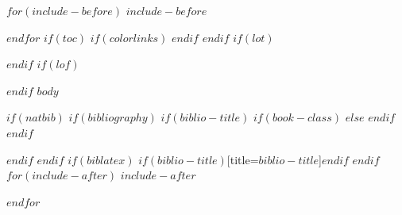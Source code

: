 \documentclass[
    twoside,
    numbers=noenddot,
    headinclude,
    footinclude=false, %
    paper=a4,
    11pt,
]{report}
\renewcommand{\bibname}{References}
\begin{document}
$for(include-before)$
$include-before$

$endfor$
$if(toc)$
{
    $if(colorlinks)$
    \hypersetup{linkcolor=$if(toccolor)$$toccolor$$else$$endif$}
    $endif$
    \setcounter{tocdepth}{$toc-depth$}
    \tableofcontents
}
$endif$
$if(lot)$
\listoftables
$endif$
$if(lof)$
\listoffigures
$endif$
$body$

$if(natbib)$
$if(bibliography)$
$if(biblio-title)$
$if(book-class)$
\renewcommand\bibname{$biblio-title$}
$else$
\renewcommand\refname{$biblio-title$}
$endif$
$endif$


$endif$
$endif$
$if(biblatex)$
\printbibliography$if(biblio-title)$[title=$biblio-title$]$endif$
$endif$
$for(include-after)$
$include-after$

$endfor$
\end{document}
